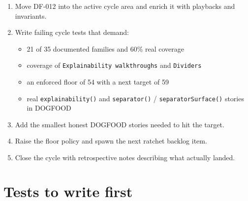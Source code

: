 \begin{enumerate}
\def\labelenumi{\arabic{enumi}.}
\tightlist
\item
  Move DF-012 into the active cycle area and enrich it with playbacks and invariants.
\item
  Write failing cycle tests that demand:

  \begin{itemize}
  \tightlist
  \item
    21 of 35 documented families and 60\% real coverage
  \item
    coverage of \texttt{E\allowbreak{}x\allowbreak{}p\allowbreak{}l\allowbreak{}a\allowbreak{}i\allowbreak{}n\allowbreak{}a\allowbreak{}b\allowbreak{}i\allowbreak{}l\allowbreak{}i\allowbreak{}t\allowbreak{}y\allowbreak{} \allowbreak{}w\allowbreak{}a\allowbreak{}l\allowbreak{}k\allowbreak{}t\allowbreak{}h\allowbreak{}r\allowbreak{}o\allowbreak{}u\allowbreak{}g\allowbreak{}h\allowbreak{}s} and \texttt{D\allowbreak{}i\allowbreak{}v\allowbreak{}i\allowbreak{}d\allowbreak{}e\allowbreak{}r\allowbreak{}s}
  \item
    an enforced floor of 54 with a next target of 59
  \item
    real \texttt{e\allowbreak{}x\allowbreak{}p\allowbreak{}l\allowbreak{}a\allowbreak{}i\allowbreak{}n\allowbreak{}a\allowbreak{}b\allowbreak{}i\allowbreak{}l\allowbreak{}i\allowbreak{}t\allowbreak{}y\allowbreak{}(\allowbreak{})} and \texttt{s\allowbreak{}e\allowbreak{}p\allowbreak{}a\allowbreak{}r\allowbreak{}a\allowbreak{}t\allowbreak{}o\allowbreak{}r\allowbreak{}(\allowbreak{})} / \texttt{s\allowbreak{}e\allowbreak{}p\allowbreak{}a\allowbreak{}r\allowbreak{}a\allowbreak{}t\allowbreak{}o\allowbreak{}r\allowbreak{}S\allowbreak{}u\allowbreak{}r\allowbreak{}f\allowbreak{}a\allowbreak{}c\allowbreak{}e\allowbreak{}(\allowbreak{})} stories in DOGFOOD
  \end{itemize}
\item
  Add the smallest honest DOGFOOD stories needed to hit the target.
\item
  Raise the floor policy and spawn the next ratchet backlog item.
\item
  Close the cycle with retrospective notes describing what actually landed.
\end{enumerate}

\section{Tests to write first}\label{record-074-tests-to-write-first}

